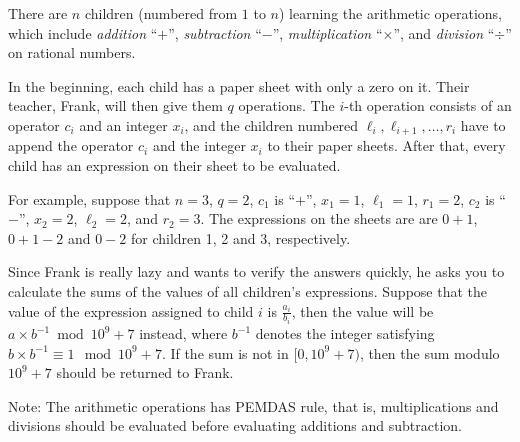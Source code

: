 There are $n$ children (numbered from $1$ to $n$) learning
the arithmetic operations, which include \emph{addition} ``$+$'', 
\emph{subtraction} ``$-$'', 
\emph{multiplication} ``$\times$'', and \emph{division} ``$\div$'' on 
rational numbers.

In the beginning, each child has a paper sheet with only a zero on it. 
Their teacher, Frank, will then give them $q$ operations. 
The $i$-th operation consists of an operator $c_i$ and an integer $x_i$,
and the children numbered $\ell_i,\ell_{i+1},\dots,r_i$ have to append the 
operator $c_i$ and the integer $x_i$ to their paper sheets.
After that, every child has an expression on their sheet to be evaluated.

For example, suppose that $n=3$, $q=2$, $c_1$ is ``$+$'', $x_1=1$, $\ell_1=1$, 
$r_1=2$, $c_2$ is ``$-$'',  $x_2=2$, $\ell_2=2$, and $r_2=3$. 
The expressions on the sheets are are $0+1$, $0+1-2$ and $0-2$ for 
children 1, 2 and 3, respectively.

Since Frank is really lazy and wants to verify the answers quickly,
he asks you to calculate the sums of the values of all children's 
expressions. 
Suppose that the value of the expression assigned to child $i$ is 
$\frac{a_i}{b_i}$, 
then the value will be $a\times b^{-1}\bmod 10^9+7$ instead, 
where $b^{-1}$ denotes the integer satisfying 
$b\times b^{-1}\equiv 1\mod 10^9+7$. 
If the sum is not in $[0, 10^9+7)$, then the sum modulo $10^9+7$ should be
returned to Frank.

Note: The arithmetic operations has PEMDAS rule, that is, 
multiplications and divisions should be evaluated before evaluating additions
and subtraction.
